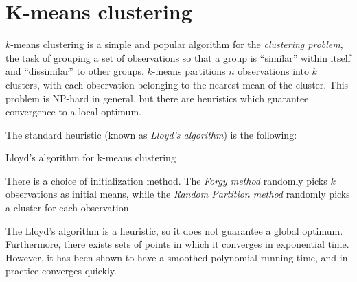 \part*{K-means clustering}

$k$-means clustering is a simple and popular algorithm for the \textit{clustering
problem}, the task of grouping a set of observations so that a group
is ``similar'' within itself and ``dissimilar'' to other groups.
$k$-means partitions $n$ observations into $k$ clusters, with each
observation belonging to the nearest mean of the cluster. This problem
is NP-hard in general, but there are heuristics which guarantee convergence
to a local optimum.

The standard heuristic (known as \textit{Lloyd's algorithm}) is the
following:

\begin{algorithm}
\caption{Lloyd's algorithm for k-means clustering}


\begin{algorithmic}[1]
\EndWhile
\end{algorithmic} 
\end{algorithm}


There is a choice of initialization method. The \textit{Forgy method}
randomly picks $k$ observations as initial means, while the \textit{Random
Partition method} randomly picks a cluster for each observation.

The Lloyd's algorithm is a heuristic, so it does not guarantee a global
optimum. Furthermore, there exists sets of points in which it converges
in exponential time. However, it has been shown to have a smoothed
polynomial running time, and in practice converges quickly.
